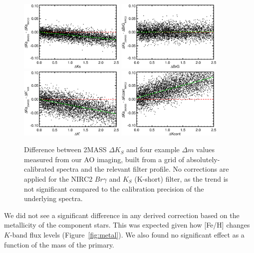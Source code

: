 \documentclass[twocolumn]{aastex62}
\begin{document}
\begin{figure}[htp]
\begin{center}
\includegraphics[width=0.45\textwidth]{NACO_Ks.eps}
\includegraphics[width=0.45\textwidth]{NIRC2_BrG.eps}
\includegraphics[width=0.45\textwidth]{KIR_Kp.eps}
\includegraphics[width=0.45\textwidth]{NIRC2_Kcont.eps}
\caption{Difference between 2MASS $\Delta K_S$ and four example $\Delta m$ values measured from our AO imaging, built from a grid of absolutely-calibrated spectra and the relevant filter profile. No corrections are applied for the NIRC2 $Br\gamma$ and $K_S$ (K-short) filter, as the trend is not significant compared to the calibration precision of the underlying spectra. }
\label{fig:mags}
\end{center}
\end{figure}

We did not see a significant difference in any derived correction based on the metallicity of the component stars. This was expected given how [Fe/H] changes $K$-band flux levels (Figure~\ref{fig:metal}). We also found no significant effect as a function of the mass of the primary. 
\end{document}

